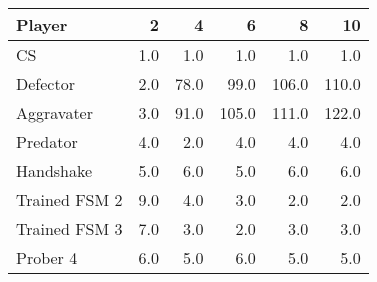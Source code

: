 \begin{tabular}{lrrrrr}
\toprule
        Player &    2 &     4 &      6 &      8 &     10 \\
\midrule
            CS &  1.0 &   1.0 &    1.0 &    1.0 &    1.0 \\
      Defector &  2.0 &  78.0 &   99.0 &  106.0 &  110.0 \\
    Aggravater &  3.0 &  91.0 &  105.0 &  111.0 &  122.0 \\
      Predator &  4.0 &   2.0 &    4.0 &    4.0 &    4.0 \\
     Handshake &  5.0 &   6.0 &    5.0 &    6.0 &    6.0 \\
 Trained FSM 2 &  9.0 &   4.0 &    3.0 &    2.0 &    2.0 \\
 Trained FSM 3 &  7.0 &   3.0 &    2.0 &    3.0 &    3.0 \\
      Prober 4 &  6.0 &   5.0 &    6.0 &    5.0 &    5.0 \\
\bottomrule
\end{tabular}
